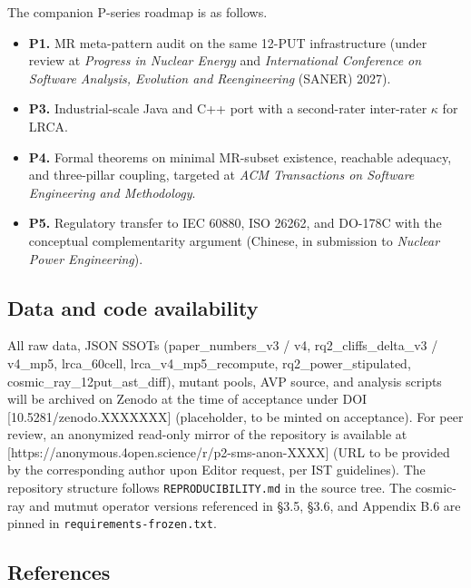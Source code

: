\documentclass[review,12pt,authoryear]{elsarticle}
\providecommand{\tightlist}{\setlength{\itemsep}{0pt}\setlength{\parskip}{0pt}}
\begin{document}
The companion P-series roadmap is as follows.

\begin{itemize}
\tightlist
\item
  \textbf{P1.} MR meta-pattern audit on the same 12-PUT infrastructure
  (under review at \emph{Progress in Nuclear Energy} and
  \emph{International Conference on Software Analysis, Evolution and
  Reengineering} (SANER) 2027).
\item
  \textbf{P3.} Industrial-scale Java and C++ port with a second-rater
  inter-rater $\kappa$ for LRCA.
\item
  \textbf{P4.} Formal theorems on minimal MR-subset existence, reachable
  adequacy, and three-pillar coupling, targeted at \emph{ACM
  Transactions on Software Engineering and Methodology}.
\item
  \textbf{P5.} Regulatory transfer to IEC 60880, ISO 26262, and DO-178C
  with the conceptual complementarity argument (Chinese, in submission
  to \emph{Nuclear Power Engineering}).
\end{itemize}


\subsection{Data and code availability}\label{data-and-code-availability}

All raw data, JSON SSOTs (paper\_numbers\_v3 / v4,
rq2\_cliffs\_delta\_v3 / v4\_mp5, lrca\_60cell,
lrca\_v4\_mp5\_recompute, rq2\_power\_stipulated,
cosmic\_ray\_12put\_ast\_diff), mutant pools, AVP source, and analysis
scripts will be archived on Zenodo at the time of acceptance under DOI
{[}10.5281/zenodo.XXXXXXX{]} (placeholder, to be minted on acceptance).
For peer review, an anonymized read-only mirror of the repository is
available at {[}https://anonymous.4open.science/r/p2-sms-anon-XXXX{]}
(URL to be provided by the corresponding author upon Editor request, per
IST guidelines). The repository structure follows
\texttt{REPRODUCIBILITY.md} in the source tree. The cosmic-ray and
mutmut operator versions referenced in §3.5, §3.6, and Appendix B.6 are
pinned in \texttt{requirements-frozen.txt}.


\subsection{References}\label{references}
\end{document}
